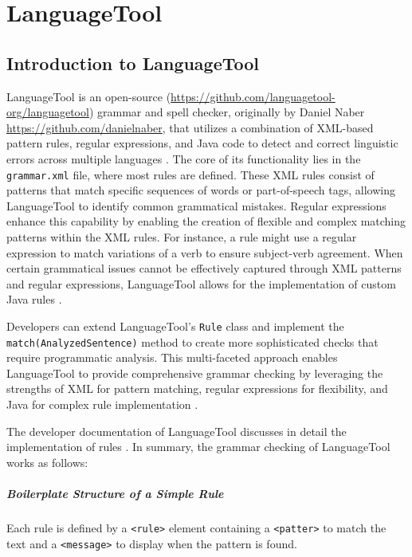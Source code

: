 \chapter{LanguageTool}
\label{language_tool}
\section{Introduction to LanguageTool}

LanguageTool is an open-source (\url{https://github.com/languagetool-org/languagetool}) grammar and spell checker, originally by Daniel Naber \url{https://github.com/danielnaber}, that utilizes a combination of XML-based pattern rules, regular expressions, and Java code to detect and correct linguistic errors across multiple languages \cite{about_languagetool}. The core of its functionality lies in the \texttt{grammar.xml} file, where most rules are defined. These XML rules consist of patterns that match specific sequences of words or part-of-speech tags, allowing LanguageTool to identify common grammatical mistakes. Regular expressions enhance this capability by enabling the creation of flexible and complex matching patterns within the XML rules. For instance, a rule might use a regular expression to match variations of a verb to ensure subject-verb agreement. When certain grammatical issues cannot be effectively captured through XML patterns and regular expressions, LanguageTool allows for the implementation of custom Java rules \cite{LanguageToolGitHub}. 

Developers can extend LanguageTool's \texttt{Rule} class and implement the \texttt{match(AnalyzedSentence)} method to create more sophisticated checks that require programmatic analysis. This multi-faceted approach enables LanguageTool to provide comprehensive grammar checking by leveraging the strengths of XML for pattern matching, regular expressions for flexibility, and Java for complex rule implementation \cite{LanguageToolGitHub}.

The developer documentation of LanguageTool discusses in detail the implementation of rules \cite{LanguageToolDevDocs}. In summary, the grammar checking of LanguageTool works as follows:

\paragraph{Boilerplate Structure of a Simple Rule} Each rule is defined by a \texttt{<rule>} element containing a \texttt{<patter>} to match the text and a \texttt{<message>} to display when the pattern is found.

